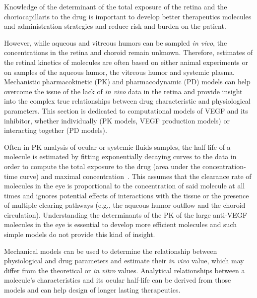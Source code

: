 \documentclass[12pt,a4paper]{journal}
\begin{document}
Knowledge of the determinant of the total exposure of the retina and the choriocapillaris to the drug is important to develop better therapeutics molecules and administration strategies and reduce risk and burden on the patient.

However, while aqueous and vitreous humors can be sampled \textit{in vivo}, the concentrations in the retina and choroid remain unknown. 
Therefore, estimates of the retinal kinetics of molecules are often based on either animal experiments or on samples of the aqueous humor, the vitreous humor and systemic plasma.
Mechanistic pharmacokinetic (PK) and pharmacodynamic (PD) models can help overcome the issue of the lack of \textit{in vivo} data in the retina and provide insight into the complex true relationships between drug characteristic and physiological parameters.
This section is dedicated to computational models of VEGF and its inhibitor, whether individually (PK models, VEGF production models) or interacting together (PD models).


Often in PK analysis of ocular or systemic fluids samples, the half-life of a molecule is estimated by fitting exponentially decaying curves to the data in order to compute the total exposure to the drug (area under the concentration-time curve) and maximal concentration~\cite{Bakri_2007, Kaiser_2019, Park_2015, Park_2016, Xu_2013}.
This assumes that the clearance rate of molecules in the eye is proportional to the concentration of said molecule at all times and ignores potential effects of interactions with the tissue or the presence of multiple clearing pathways (e.g., the aqueous humor outflow and the choroid circulation).
Understanding the determinants of the PK of the large anti-VEGF molecules in the eye is essential to develop more efficient molecules and such simple models do not provide this kind of insight.

Mechanical models can be used to determine the relationship between physiological and drug parameters and estimate their \textit{in vivo} value, which may differ from the theoretical or \textit{in vitro} values.
Analytical relationships between a molecule's characteristics and its ocular half-life can be derived from those models and can help design of longer lasting therapeutics.
\end{document}
